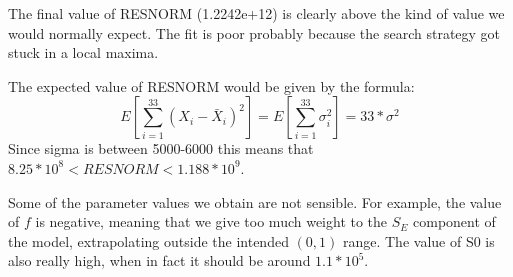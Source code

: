 \documentclass[11pt,a4paper,oneside]{report}
\begin{document}

The final value of RESNORM (1.2242e+12) is clearly above the kind of value we would normally expect. The fit is poor probably because the search strategy got stuck in a local maxima.

 

The expected value of RESNORM would be given by the formula:
$$E\left[\sum_{i=1}^{33} (X_i - \bar{X}_i)^2\right] = E\left[\sum_{i=1}^{33} \sigma_i^2\right] = 33 * \sigma^2 $$
Since sigma is between 5000-6000 this means that $ 8.25*10^8 < RESNORM < 1.188 * 10^9$.


Some of the parameter values we obtain are not sensible. For example, the value of $f$ is negative, meaning that we give too much weight to the $S_E$ component of the model, extrapolating outside the intended $(0,1)$ range. The value of S0 is also really high, when in fact it should be around $1.1 * 10^5$. 
\end{document}
